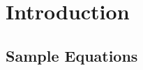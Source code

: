 \documentclass{report}
\begin{document}
	
	\tableofcontents
	\listofmyequations %
	
	\chapter{Introduction}
	\section{Sample Equations}
	
\end{document}
